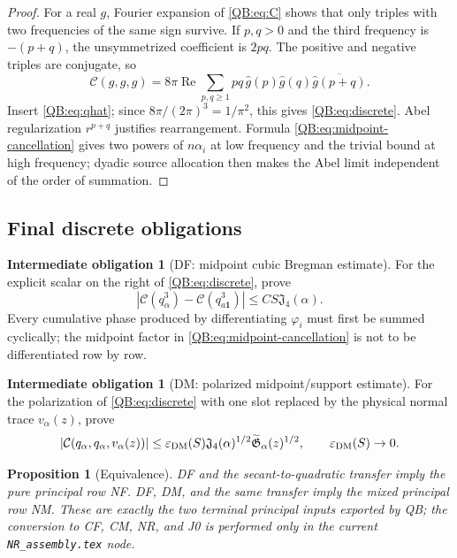 \documentclass[11pt]{amsart}
\numberwithin{equation}{section}
\newtheorem{proposition}[theorem]{Proposition}
\theoremstyle{definition}
\newtheorem{obligation}[theorem]{Intermediate obligation}
\theoremstyle{remark}
\newcommand{\Jfour}{\mathfrak J_4}
\newcommand{\Cnull}{\mathcal C}
\begin{document}
\begin{proof}
For a real $g$, Fourier expansion of \eqref{QB:eq:C} shows that only triples
with two frequencies of the same sign survive.  If $p,q>0$ and the third
frequency is $-(p+q)$, the unsymmetrized coefficient is $2pq$.
The positive and negative triples are conjugate, so
\begin{equation*}
 \Cnull(g,g,g)=8\pi\operatorname{Re}
 \sum_{p,q\ge1}pq\,\widehat g(p)\widehat g(q)
 \overline{\widehat g(p+q)}.
\end{equation*}
Insert \eqref{QB:eq:qhat}; since
$8\pi/(2\pi)^3=1/\pi^2$, this gives \eqref{QB:eq:discrete}.
Abel regularization $r^{p+q}$ justifies rearrangement.  Formula
\eqref{QB:eq:midpoint-cancellation} gives two powers of $n\alpha_i$ at low
frequency and the trivial bound at high frequency; dyadic source
allocation then makes the Abel limit independent of the order of
summation.
\end{proof}

\subsection{Final discrete obligations}

\begin{obligation}[DF: midpoint cubic Bregman estimate]
\label{QB:obl:DF}
For the explicit scalar on the right of \eqref{QB:eq:discrete}, prove
\begin{equation}\label{QB:eq:DF}
 |\Cnull(q_\alpha^3)-\Cnull(q_{a\mathbf1}^3)|
 \le CS\Jfour(\alpha).
\end{equation}
Every cumulative phase produced by differentiating $\varphi_i$ must first
be summed cyclically; the midpoint factor in
\eqref{QB:eq:midpoint-cancellation} is not to be differentiated row by row.
\end{obligation}

\begin{obligation}[DM: polarized midpoint/support estimate]
\label{QB:obl:DM}
For the polarization of \eqref{QB:eq:discrete} with one slot replaced by the
physical normal trace $v_\alpha(z)$, prove
\begin{equation}\label{QB:eq:DM}
 |\Cnull(q_\alpha,q_\alpha,v_\alpha(z))|
 \le\varepsilon_{\rm DM}(S)\Jfour(\alpha)^{1/2}
 \widetilde{\mathfrak G}_\alpha(z)^{1/2},
 \qquad \varepsilon_{\rm DM}(S)\to0.
\end{equation}
\end{obligation}

\begin{proposition}[Equivalence]
\label{QB:prop:equivalence}
DF and the secant-to-quadratic transfer imply the pure principal row NF.
DF, DM, and the same transfer imply the mixed principal row NM.  These are
exactly the two terminal principal inputs exported by QB; the conversion
to CF, CM, NR, and J0 is performed only in the current
\texttt{NR\_assembly.tex} node.
\end{proposition}
\end{document}
